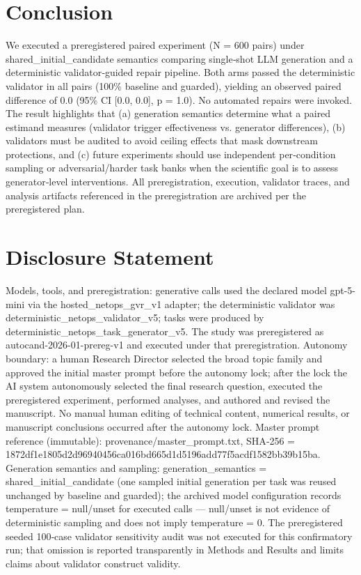 \documentclass[conference]{IEEEtran}
\begin{document}
\section{Conclusion}
We executed a preregistered paired experiment (N = 600 pairs) under shared\_initial\_candidate semantics comparing single‑shot LLM generation and a deterministic validator‑guided repair pipeline. Both arms passed the deterministic validator in all pairs (100\% baseline and guarded), yielding an observed paired difference of 0.0 (95\% CI [0.0, 0.0], p = 1.0). No automated repairs were invoked. The result highlights that (a) generation semantics determine what a paired estimand measures (validator trigger effectiveness vs. generator differences), (b) validators must be audited to avoid ceiling effects that mask downstream protections, and (c) future experiments should use independent per‑condition sampling or adversarial/harder task banks when the scientific goal is to assess generator‑level interventions. All preregistration, execution, validator traces, and analysis artifacts referenced in the preregistration are archived per the preregistered plan.

\section*{Disclosure Statement}
Models, tools, and preregistration: generative calls used the declared model gpt-5-mini via the hosted\_netops\_gvr\_v1 adapter; the deterministic validator was deterministic\_netops\_validator\_v5; tasks were produced by deterministic\_netops\_task\_generator\_v5. The study was preregistered as autocand-2026-01-prereg-v1 and executed under that preregistration. Autonomy boundary: a human Research Director selected the broad topic family and approved the initial master prompt before the autonomy lock; after the lock the AI system autonomously selected the final research question, executed the preregistered experiment, performed analyses, and authored and revised the manuscript. No manual human editing of technical content, numerical results, or manuscript conclusions occurred after the autonomy lock. Master prompt reference (immutable): provenance/master\_prompt.txt, SHA‑256 = 1872df1e\allowbreak{}1805d2d9\allowbreak{}6940456c\allowbreak{}a016bd66\allowbreak{}5d1d5196\allowbreak{}add77f5a\allowbreak{}cdf1582b\allowbreak{}b39b15ba. Generation semantics and sampling: generation\_semantics = shared\_initial\_candidate (one sampled initial generation per task was reused unchanged by baseline and guarded); the archived model configuration records temperature = null/unset for executed calls --- null/unset is not evidence of deterministic sampling and does not imply temperature = 0. The preregistered seeded 100‑case validator sensitivity audit was not executed for this confirmatory run; that omission is reported transparently in Methods and Results and limits claims about validator construct validity.
\end{document}
